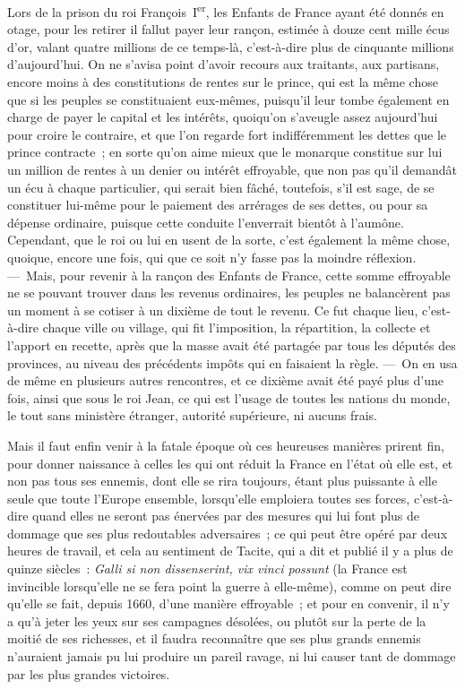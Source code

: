 \documentclass[french,twoside]{book} %
\begin{document}
Lors de la prison du roi François I\textsuperscript{er}, les Enfants de France ayant été donnés en otage, pour les retirer il fallut payer leur rançon, estimée à douze cent mille écus d’or, valant quatre millions de ce temps-là, c’est-à-dire plus de cinquante millions d’aujourd’hui. On ne s’avisa point d’avoir recours aux traitants, aux partisans, encore moins à des constitutions de rentes sur le prince, qui est la même chose que si les peuples se constituaient eux-mêmes, puisqu’il leur tombe également en charge de payer le capital et les intérêts, quoiqu’on s’aveugle assez aujourd’hui pour croire le contraire, et que l’on regarde fort indifféremment les dettes que le prince contracte ; en sorte qu’on aime mieux que le monarque constitue sur lui un million de rentes à un denier ou intérêt effroyable, que non pas qu’il demandât un écu à chaque particulier, qui serait bien fâché, toutefois, s’il est sage, de se constituer lui-même pour le paiement des arrérages de ses dettes, ou pour sa dépense ordinaire, puisque cette conduite l’enverrait bientôt à l’aumône. Cependant, que le roi ou lui en usent de la sorte, c’est également la même chose, quoique, encore une fois, qui que ce soit n’y fasse pas la moindre réflexion. — Mais, pour revenir à la rançon des Enfants de France, cette somme effroyable ne se pouvant trouver dans les revenus ordinaires, les peuples ne balancèrent pas un moment à se cotiser à un dixième de tout le revenu. Ce fut chaque lieu, c’est-à-dire chaque ville ou village, qui fit l’imposition, la répartition, la collecte et l’apport en recette, après que la masse avait été partagée par tous les députés des provinces, au niveau des précédents impôts qui en faisaient la règle. — On en usa de même en plusieurs autres rencontres, et ce dixième avait été payé plus d’une fois, ainsi que sous le roi Jean, ce qui est l’usage de toutes les nations du monde, le tout sans ministère étranger, autorité supérieure, ni aucuns frais.\par
Mais il faut enfin venir à la fatale époque où ces heureuses manières prirent fin, pour donner naissance à celles les qui ont réduit la France en l’état où elle est, et non pas tous ses ennemis, dont elle se rira toujours, étant plus puissante à elle seule que toute l’Europe ensemble, lorsqu’elle emploiera toutes ses forces, c’est-à-dire quand elles ne seront pas énervées par des mesures qui lui font plus de dommage que ses plus redoutables adversaires ; ce qui peut être opéré par deux heures de travail, et cela au sentiment de Tacite, qui a dit et publié il y a plus de quinze siècles : {\itshape Galli si non dissenserint, vix vinci possunt} (la France est invincible lorsqu’elle ne se fera point la guerre à elle-même), comme on peut dire qu’elle se fait, depuis 1660, d’une manière effroyable ; et pour en convenir, il n’y a qu’à jeter les yeux sur ses campagnes désolées, ou plutôt sur la perte de la moitié de ses richesses, et il faudra reconnaître que ses plus grands ennemis n’auraient jamais pu lui produire un pareil ravage, ni lui causer tant de dommage par les plus grandes victoires.\par
\end{document}
